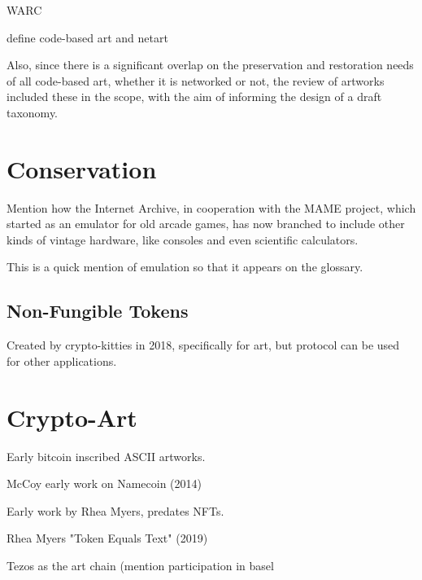 WARC





\todo define code-based art and netart

Also, since there is a significant overlap on the preservation and restoration needs of all code-based art, whether it is networked or not, the review of artworks included these in the scope, with the aim of informing the design of a draft taxonomy.










\section{Conservation}

Mention how the Internet Archive, in cooperation with the MAME project, which started as an emulator for old arcade games, has now branched to include other kinds of vintage hardware, like consoles and even scientific calculators. \cite{scottjasonCalculatedMoveCalculators2023}

This is a quick mention of \gls{emulation} so that it appears on the glossary.













\subsection{Non-Fungible Tokens}
Created by crypto-kitties in 2018, specifically for art, but protocol can be used for other applications.






\section{Crypto-Art}


Early bitcoin inscribed ASCII artworks.

McCoy early work on Namecoin (2014)

Early work by Rhea Myers, predates NFTs.

Rhea Myers "Token Equals Text" (2019)


Tezos as the art chain (mention participation in basel



